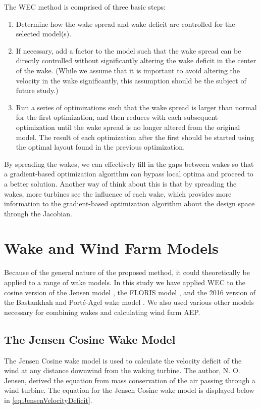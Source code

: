 \documentclass[a4paper]{jpconf}
\begin{document}
The WEC method is comprised of three basic steps:
\begin{enumerate}[label=\arabic*)]
	\item Determine how the wake spread and wake deficit are controlled for the selected model(s).
    \item If necessary, add a factor to the model such that the wake spread can be directly controlled without significantly altering the wake deficit in the center of the wake. (While we assume that it is important to avoid altering the velocity in the wake significantly, this assumption should be the subject of future study.)
    \item Run a series of optimizations such that the wake spread is larger than normal for the first optimization, and then reduces with each subsequent optimization until the wake spread is no longer altered from the original model. The result of each optimization after the first should be started using the optimal layout found in the previous optimization.
\end{enumerate}
By spreading the wakes, we can effectively fill in the gaps between wakes so that a gradient-based optimization algorithm can bypass local optima and proceed to a better solution. Another way of think about this is that by spreading the wakes, more turbines see the influence of each wake, which provides more information to the gradient-based optimization algorithm about the design space through the Jacobian.

\section{Wake and Wind Farm Models}
Because of the general nature of the proposed method, it could theoretically be applied to a range of wake models. In this study we have applied WEC to the cosine version of the Jensen model \cite{jensen1983}, the FLORIS model \cite{gebraad2014,thomas2017-Improving-FLORIS}, and the 2016 version of the Bastankhah and Port\'e-Agel wake model \cite{bastankhah2016}. We also used various other models necessary for combining wakes and calculating wind farm AEP.

\subsection{The Jensen Cosine Wake Model}
The Jensen Cosine wake model is used to calculate the velocity deficit of the wind at any distance downwind from the waking turbine. The author, N. O. Jensen, derived the equation from mass conservation of the air passing through a wind turbine. The equation for the Jensen Cosine wake model is displayed below in \cref{eq:JensenVelocityDeficit}.
\end{document}

